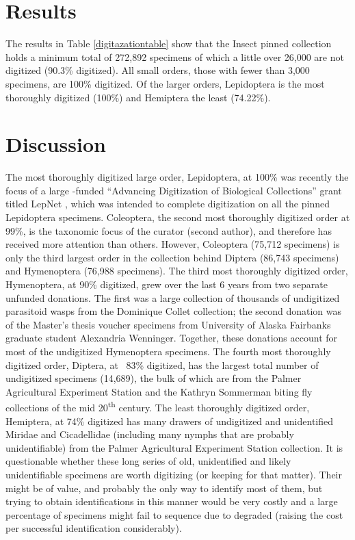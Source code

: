 \begin{multicols}{2} 



\section{Results}

The results in Table \ref{digitazationtable} show that the  Insect pinned collection holds a minimum total of 272,892 specimens of which a little over 26,000 are not digitized (90.3\% digitized). All small orders, those with fewer than 3,000 specimens, are 100\% digitized. Of the larger orders, Lepidoptera is the most thoroughly digitized (100\%) and Hemiptera the least (74.22\%). 

\section{Discussion}

The most thoroughly digitized large order, Lepidoptera, at 100\% was recently the focus of a large -funded “Advancing Digitization of Biological Collections” grant titled LepNet \citep{Seltmannetal2017}, which was intended to complete digitization on all the  pinned Lepidoptera specimens. Coleoptera, the second most thoroughly digitized order at 99\%, is the taxonomic focus of the curator (second author), and therefore has received more attention than others. However, Coleoptera (75,712 specimens) is only the third largest order in the collection behind Diptera (86,743 specimens) and Hymenoptera (76,988 specimens). The third most thoroughly digitized order, Hymenoptera, at 90\% digitized, grew over the last 6 years from two separate unfunded donations. The first was a large collection of thousands of undigitized parasitoid wasps from the Dominique Collet collection; the second donation was of the Master’s thesis voucher specimens from University of Alaska Fairbanks graduate student Alexandria Wenninger. Together, these donations account for most of the undigitized Hymenoptera specimens. The fourth most thoroughly digitized order, Diptera, at ~83\% digitized, has the largest total number of undigitized specimens (14,689), the bulk of which are from the  Palmer Agricultural Experiment Station and the Kathryn Sommerman biting fly collections of the mid 20\textsuperscript{th} century. The least thoroughly digitized order, Hemiptera, at 74\% digitized has many drawers of undigitized and unidentified Miridae and Cicadellidae (including many nymphs that are probably unidentifiable) from the  Palmer Agricultural Experiment Station collection. It is questionable whether these long series of old, unidentified and likely unidentifiable specimens are worth digitizing (or keeping for that matter). Their  might be of value, and probably the only way to identify most of them, but trying to obtain identifications in this manner would be very costly and a large percentage of specimens might fail to sequence due to degraded  (raising the cost per successful identification considerably).


\end{multicols}
